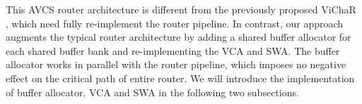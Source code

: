 \documentclass[10pt,conference]{IEEEtran}
\begin{document}
This AVCS router architecture is different from the previously proposed ViChaR \cite{NPKV06}, which need fully re-implement the router pipeline. In contrast, our approach augments the typical router architecture \cite{DaTo01} by adding a shared buffer allocator for each shared buffer bank and re-implementing the VCA and SWA. The buffer allocator works in parallel with the router pipeline, which imposes no negative effect on the critical path of entire router. We will introduce the implementation of buffer allocator, VCA and SWA in the following two subsections.

\end{document}
